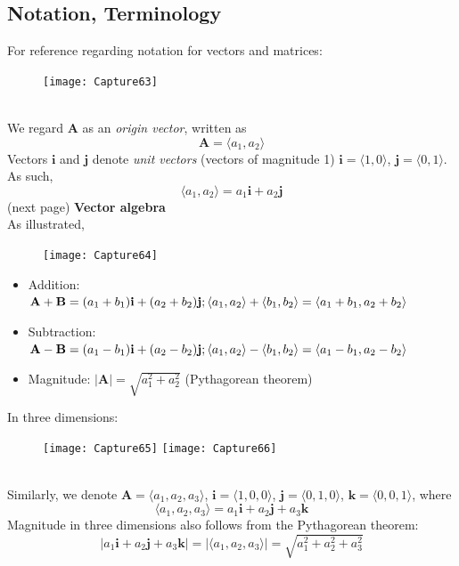 \documentclass{report}
\begin{document}
\subsection{Notation, Terminology}
For reference regarding notation for vectors and matrices:
\begin{figure}[h]
\texttt{[image: Capture63]}\\
\centering
\end{figure}\\
We regard $\mathbf{A}$ as an \textit{origin vector}, written as
\begin{equation*}
\mathbf{A}=\langle a_1,a_2\rangle
\end{equation*}
Vectors $\mathbf{i}$ and $\mathbf{j}$ denote \textit{unit vectors} (vectors of magnitude 1) $\mathbf{i}=
\langle 1,0\rangle$, $\mathbf{j}=\langle 0,1\rangle$.
As such,
\begin{equation*}
\langle a_1,a_2\rangle=a_1\mathbf{i}+a_2\mathbf{j}
\end{equation*}
(next page)
\newpage
\noindent\textbf{Vector algebra}\\
As illustrated,
\begin{figure}[h]
\texttt{[image: Capture64]}\\
\centering
\end{figure}
\begin{itemize}
\item Addition: $\mathbf{A+B}=(a_1+b_1)\mathbf{i}+(a_2+b_2)\mathbf{j};\\
\langle a_1,a_2\rangle+\langle b_1,b_2\rangle=
\langle a_1+b_1,a_2+b_2\rangle$
\item Subtraction: $\mathbf{A-B}=(a_1-b_1)\mathbf{i}+(a_2-b_2)\mathbf{j};\\
\langle a_1,a_2\rangle-\langle b_1,b_2\rangle=
\langle a_1-b_1,a_2-b_2\rangle$
\item Magnitude: $\mathbf{|A|}=\sqrt{a_1^2+a_2^2}$ (Pythagorean theorem)
\end{itemize}
In three dimensions:
\begin{figure}[h]
\texttt{[image: Capture65]}
\texttt{[image: Capture66]}\\
\centering
\end{figure}\\
Similarly, we denote $\mathbf{A}=\langle a_1,a_2,a_3\rangle$, 
$\mathbf{i}=\langle 1,0,0\rangle$, $\mathbf{j}=\langle 0,1,0\rangle$, 
$\mathbf{k}=\langle 0,0,1\rangle$, where
\begin{equation*}
\langle a_1,a_2,a_3\rangle=a_1\mathbf{i}+a_2\mathbf{j}+a_3\mathbf{k}
\end{equation*}
Magnitude in three dimensions also follows from the Pythagorean theorem:
\begin{equation*}
|a_1\mathbf{i}+a_2\mathbf{j}+a_3\mathbf{k}|=|\langle a_1,a_2,a_3\rangle|
=\sqrt{a_1^2+a_2^2+a_3^2}
\end{equation*}
\newpage
\end{document}
